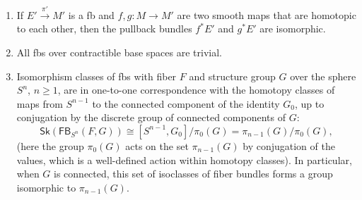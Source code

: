 \documentclass[english,letterpaper]{article}%
\numberwithin{equation}{section}
\numberwithin{figure}{section}
\numberwithin{table}{section}
\theoremstyle{definition}
\theoremstyle{definition}
\theoremstyle{definition}
\theoremstyle{plain}
\theoremstyle{plain}
\theoremstyle{plain}
\theoremstyle{plain}
\theoremstyle{remark}
\theoremstyle{remark}
\renewcommand{\geq}{\geqslant}
\begin{document}
\begin{cor}\label{HLP cor}
\begin{enumerate}
    \item If $E'\overset{\pi'}{\to}M'$ is a \gls{fb} and $f,g:M\to M'$ are two smooth maps that are homotopic to each other, then the pullback bundles $f^\ast E'$ and $g^\ast E'$ are isomorphic.
    \item All \glspl{fb} over contractible base spaces are trivial.
    \item Isomorphism classes of \glspl{fb} with fiber $F$ and structure group $G$ over the sphere $S^n$, $n\geq 1$, are in one-to-one correspondence with the homotopy classes of maps from $S^{n-1}$ to the connected component of the identity $G_0$, up to conjugation by the discrete group of connected components of $G$:
    \[
    \mathsf{Sk}\left(\mathsf{FB}_{S^n}(F,G)\right)\cong [S^{n-1},G_0]/\pi_0(G)= \pi_{n-1}(G)/\pi_0(G),\label{FB(G) and homotopy(G)}
    \]
    (here the group $\pi_0(G)$ acts on the set $\pi_{n-1}(G)$ by conjugation of the values, which is a well-defined action within homotopy classes). In particular, when $G$ is connected, this set of isoclasses of fiber bundles forms a group isomorphic to $\pi_{n-1}(G)$.
\end{enumerate}
\end{cor}
\end{document}
